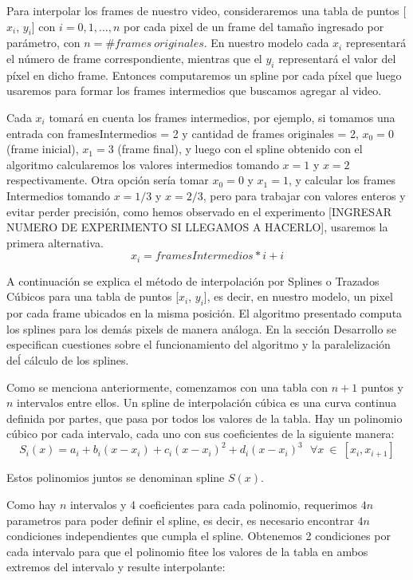\par Para interpolar los frames de nuestro video, consideraremos una tabla de puntos [$x_i$, $y_i$] con $i=0,1,...,n$ por cada pixel de un frame del tamaño ingresado por parámetro, con $n=\#frames\ originales$. En nuestro modelo cada $x_{i}$ representará el número de frame correspondiente, mientras que el $y_{i}$ representará el valor del píxel en dicho frame. Entonces computaremos un spline por cada píxel que luego usaremos para formar los frames intermedios que buscamos agregar al video.

\par Cada $x_i$ tomará en cuenta los frames intermedios, por ejemplo, si tomamos una entrada con framesIntermedios = 2 y cantidad de frames originales = 2, $x_0=0$(frame inicial), $x_1=3$ (frame final), y luego con el spline obtenido con el algoritmo calcularemos los valores intermedios tomando $x=1$ y $x=2$ respectivamente. Otra opción sería tomar $x_0=0$ y $x_1=1$, y calcular los frames Intermedios tomando $x=1/3$ y $x=2/3$, pero para trabajar con valores enteros y evitar perder precisión, como hemos observado en el experimento [INGRESAR NUMERO DE EXPERIMENTO SI LLEGAMOS A HACERLO], usaremos la primera alternativa. 
\begin{equation*}\label{calculo de xi}
x_i = framesIntermedios * i + i
\end{equation*}
\par A continuación se explica el método de interpolación por Splines o Trazados Cúbicos para una tabla de puntos [$x_i$, $y_i$], es decir, en nuestro modelo, un pixel por cada frame ubicados en la misma posición. El algoritmo presentado computa los splines para los demás pixels de manera análoga. En la sección Desarrollo se especifican cuestiones sobre el funcionamiento del algoritmo y la paralelización deĺ cálculo de los splines.
\par Como se menciona anteriormente, comenzamos con una tabla con $n+1$ puntos y $n$ intervalos entre ellos. Un spline de interpolación cúbica es una curva continua definida por partes, que pasa por todos los valores de la tabla. Hay un polinomio cúbico por cada intervalo, cada uno con sus coeficientes de la siguiente manera:
\begin{equation*}\label{splines}
S_i(x) = a_i + b_i(x-x_i) + c_i(x-x_i)^2 + d_i(x-x_i)^3 \ \ \ \forall x\ \in\ [x_i, x_{i+1}]
\end{equation*}
\par Estos polinomios juntos se denominan spline $S(x)$.
\par Como hay $n$ intervalos y 4 coeficientes para cada polinomio, requerimos $4n$ parametros para poder definir el spline, es decir, es necesario encontrar $4n$ condiciones independientes que cumpla el spline. Obtenemos 2 condiciones por cada intervalo para que el polinomio fitee los valores de la tabla en ambos extremos del intervalo y resulte interpolante:
